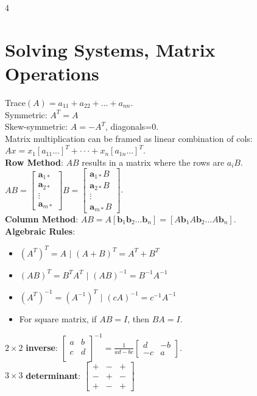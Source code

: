 \documentclass[9pt]{extarticle}
\begin{document}
\small 

\raggedright
\raggedbottom

\begin{multicols*}{4}

\section*{Solving Systems, Matrix Operations}
Trace$(A) = a_{11} + a_{22} + \dots + a_{nn}$.\\
Symmetric: $A^T=A$\\
Skew-symmetric: $A=-A^T$, diagonals=0.\\
Matrix multiplication can be framed as linear combination of cols: $Ax=x_{1}[a_{11}...]^{T}+\cdot\cdot\cdot+x_{n}[a_{1n}...]^{T}$.\\
\textbf{Row Method}: $AB$ results in a matrix where the rows are $a_{i}B$. $AB = \begin{bmatrix} \mathbf{a}_{1*} \\ \mathbf{a}_{2*} \\ \vdots \\ \mathbf{a}_{m*} \end{bmatrix} B = \begin{bmatrix} \mathbf{a}_{1*}B \\ \mathbf{a}_{2*}B \\ \vdots \\ \mathbf{a}_{m*}B \end{bmatrix}$.\\
\textbf{Column Method}: $AB = A[\mathbf{b}_{1} \mathbf{b}_{2} \ldots \mathbf{b}_{n}] = [A\mathbf{b}_{1} A\mathbf{b}_{2} \ldots A\mathbf{b}_{n}]$.\\
\textbf{Algebraic Rules}:
\begin{itemize}
    \item $(A^{T})^{T}=A$ $\vert$ $(A+B)^{T}=A^{T}+B^{T}$
    \item $(AB)^{T}=B^{T}A^{T}$ $\vert$ $(AB)^{-1}=B^{-1}A^{-1}$
    \item $(A^{T})^{-1}=(A^{-1})^{T}$ $\vert$ $(cA)^{-1}=c^{-1}A^{-1}$
    \item For square matrix, if $AB=I$, then $BA=I$.
\end{itemize}
$2 \times 2$ \textbf{inverse}: $[\begin{matrix}a&b\\ c&d\\ \end{matrix}]^{-1}=\frac{1}{ad-bc}[\begin{matrix}d&-b\\ -c&a\end{matrix}]$.\\
$3 \times 3$ \textbf{determinant}: $\begin{bmatrix} + & - & + \\ - & + & - \\ + & - & + \end{bmatrix}$\\


\end{multicols*}
\end{document}
